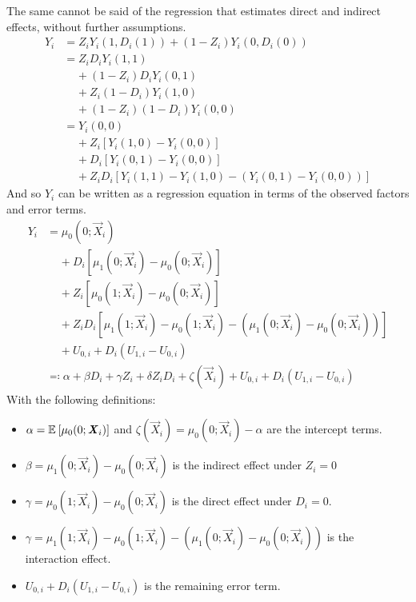 The same cannot be said of the regression that estimates direct and indirect effects, without further assumptions.
\begin{align*}
    Y_i &= Z_i Y_i(1, D_i(1)) + (1 - Z_i) Y_i(0, D_i(0)) \\
        &= Z_i D_i Y_i(1, 1) \\
        & \;\;\;\; + (1 - Z_i) D_i Y_i(0, 1) \\
        & \;\;\;\; + Z_i (1 - D_i) Y_i(1, 0) \\
        & \;\;\;\; + (1 - Z_i) (1 - D_i) Y_i(0, 0) \\
        &= Y_i(0, 0) \\
        & \;\;\;\; + Z_i \left[Y_i(1, 0) - Y_i(0, 0) \right] \\
        & \;\;\;\; + D_i \left[Y_i(0, 1) - Y_i(0, 0) \right] \\
        & \;\;\;\; + Z_i D_i \left[Y_i(1, 1) - Y_i(1, 0)
            - \left( Y_i(0, 1) - Y_i(0, 0) \right)\right]
\end{align*}
And so $Y_i$ can be written as a regression equation in terms of the observed factors and error terms.
\begin{align*}
    Y_i &= \mu_0(0; \vec X_i) \\
        & \;\;\;\; + D_i \left[\mu_1(0; \vec X_i) - \mu_0(0; \vec X_i) \right] \\
        & \;\;\;\; + Z_i \left[\mu_0(1; \vec X_i) - \mu_0(0; \vec X_i) \right] \\
        & \;\;\;\; + Z_i D_i \left[\mu_1(1; \vec X_i) - \mu_0(1; \vec X_i)
            - \left( \mu_1(0; \vec X_i) - \mu_0(0; \vec X_i) \right)\right] \\
        & \;\;\;\; + U_{0,i} + D_i \left( U_{1,i} - U_{0,i} \right) \\
        &\eqqcolon
            \alpha + \beta D_i + \gamma Z_i + \delta Z_i D_i
            + \zeta(\vec X_i)
            + U_{0,i} + D_i \left( U_{1,i} - U_{0,i} \right)
\end{align*}
With the following definitions:
\begin{itemize}
    \item $\alpha = \mathbb{E}_{} \left[ \mu_0(0; \boldsymbol{\mathit{X}}_i) \right]$ and $\zeta(\vec X_i) = \mu_0(0; \vec X_i) - \alpha$ are the intercept terms.
    \item $\beta = \mu_1(0; \vec X_i) - \mu_0(0; \vec X_i)$ is the indirect effect under $Z_i = 0$
    \item $\gamma = \mu_0(1; \vec X_i) - \mu_0(0; \vec X_i)$ is the direct effect under $D_i = 0$.
    \item $\gamma = \mu_1(1; \vec X_i) - \mu_0(1; \vec X_i)- \left( \mu_1(0; \vec X_i) - \mu_0(0; \vec X_i) \right)$ is the interaction effect.
    \item $U_{0,i} + D_i \left( U_{1,i} - U_{0,i} \right)$ is the remaining error term.
\end{itemize}
